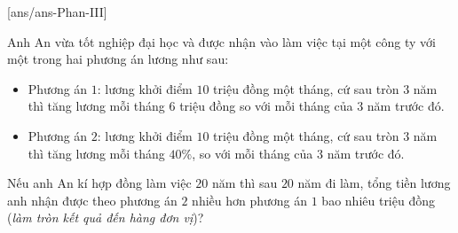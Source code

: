 \caukq
{}[ans/ans\currfilebase-Phan-III]
\begin{ex}%
	Anh An vừa tốt nghiệp đại học và được nhận vào làm việc tại một công ty với một trong hai phương án lương như sau:
	\begin{itemize}
		\item Phương án $1$: lương khởi điểm $10$ triệu đồng một tháng, cứ sau tròn $3$ năm thì tăng lương mỗi tháng $6$ triệu đồng so với mỗi tháng của $3$ năm trước đó.
		\item Phương án $2$: lương khởi điểm $10$ triệu đồng một tháng, cứ sau tròn $3$ năm thì tăng lương mỗi tháng $40\%$, so với mỗi tháng của $3$ năm trước đó.
	\end{itemize}
	Nếu anh An kí hợp đồng làm việc $20$ năm thì sau $20$ năm đi làm, tổng tiền lương anh nhận được theo phương án $2$ nhiều hơn phương án $1$ bao nhiêu triệu đồng (\textit{làm tròn kết quả đến hàng đơn vị})?
	\par
\end{ex}


